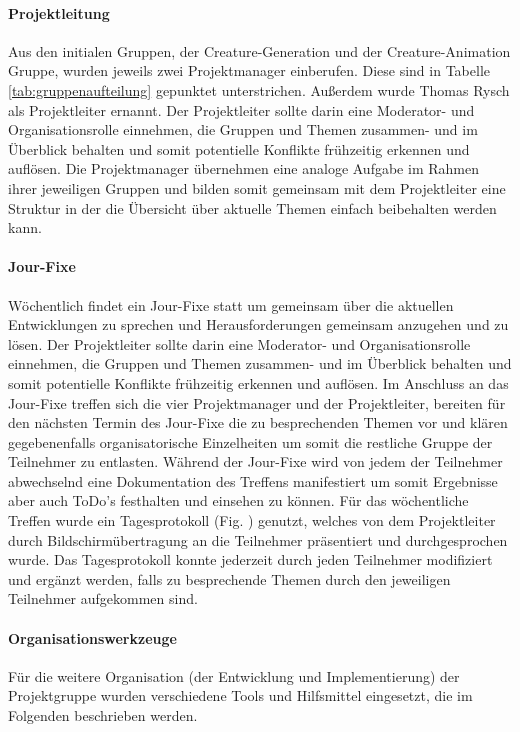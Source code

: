 \paragraph{Projektleitung}
Aus den initialen Gruppen, der Creature-Generation und der Creature-Animation Gruppe, wurden jeweils zwei Projektmanager einberufen. Diese sind in Tabelle \ref{tab:gruppenaufteilung} gepunktet unterstrichen. Außerdem wurde Thomas Rysch als Projektleiter ernannt. Der Projektleiter sollte darin eine Moderator- und Organisationsrolle einnehmen, die Gruppen und Themen zusammen- und im Überblick behalten und somit potentielle Konflikte frühzeitig erkennen und auflösen. Die Projektmanager übernehmen eine analoge Aufgabe im Rahmen ihrer jeweiligen Gruppen und bilden somit gemeinsam mit dem Projektleiter eine Struktur in der die Übersicht über aktuelle Themen einfach beibehalten werden kann.

\paragraph{Jour-Fixe}
Wöchentlich findet ein Jour-Fixe statt um gemeinsam über die aktuellen Entwicklungen zu sprechen und Herausforderungen gemeinsam anzugehen und zu lösen. Der Projektleiter sollte darin eine Moderator- und Organisationsrolle einnehmen, die Gruppen und Themen zusammen- und im Überblick behalten und somit potentielle Konflikte frühzeitig erkennen und auflösen. Im Anschluss an das Jour-Fixe treffen sich die vier Projektmanager und der Projektleiter, bereiten für den nächsten Termin des Jour-Fixe die zu besprechenden Themen vor und klären gegebenenfalls organisatorische Einzelheiten um somit die restliche Gruppe der Teilnehmer zu entlasten. Während der Jour-Fixe wird von jedem der Teilnehmer abwechselnd eine Dokumentation des Treffens manifestiert um somit Ergebnisse aber auch ToDo's festhalten und einsehen zu können. Für das wöchentliche Treffen wurde ein Tagesprotokoll (Fig. ) genutzt, welches von dem Projektleiter durch Bildschirmübertragung an die Teilnehmer präsentiert und durchgesprochen wurde. Das Tagesprotokoll konnte jederzeit durch jeden Teilnehmer modifiziert und ergänzt werden, falls zu besprechende Themen durch den jeweiligen Teilnehmer aufgekommen sind.

\paragraph{Organisationswerkzeuge}
Für die weitere Organisation (der Entwicklung und Implementierung) der Projektgruppe wurden verschiedene Tools und Hilfsmittel eingesetzt, die im Folgenden beschrieben werden.

